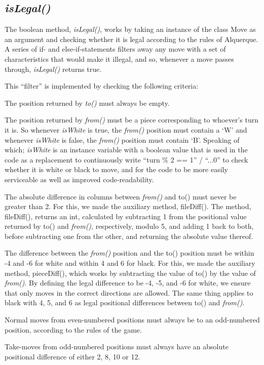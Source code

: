 \documentclass[12pt, a4paper]{article}
\begin{document}
\subsection{\emph{isLegal()}}
The boolean method, \emph{isLegal()}, works by taking an instance of the class Move as an argument and checking whether it is legal according to the rules of Alquerque. A series of if- and else-if-statements filters away any move with a set of characteristics that would make it illegal, and so, whenever a move passes through, \emph{isLegal()} returns true. \par 
This “filter” is implemented by checking the following criteria: \par
The position returned by \emph{to()} must always be empty. \par 
The position returned by \emph{from()} must be a piece corresponding to whoever's turn it is. So whenever \emph{isWhite} is true, the \emph{from()} position must contain a ‘W’ and whenever \emph{isWhite} is false, the \emph{from()} position must contain ‘B’. Speaking of which; \emph{isWhite} is an instance variable with a boolean value that is used in the code as a replacement to continuously write “turn \% 2 == 1” / “...0”  to check whether it is white or black to move, and for the code to be more easily serviceable as well as improved code-readability. \par
The absolute difference in columns between \emph{from()} and to() must never be greater than 2. For this, we made the auxiliary method, fileDiff(). The method, fileDiff(), returns an int, calculated by subtracting 1 from the positional value returned by to() and \emph{from()}, respectively, modulo 5, and adding 1 back to both, before subtracting one from the other, and returning the absolute value thereof. \par 
The difference between the \emph{from()} position and the to() position must be within -4 and -6 for white and within 4 and 6 for black. For this, we made the auxiliary method, pieceDiff(), which works by subtracting the value of to() by the value of \emph{from()}. By defining the legal difference to be -4, -5, and -6 for white, we ensure that only moves in the correct directions are allowed. The same thing applies to black with 4, 5, and 6 as legal positional differences between to() and \emph{from()}. \par
Normal moves from even-numbered positions must always be to an odd-numbered position, according to the rules of the game. \par
Take-moves from odd-numbered positions must always have an absolute positional difference of either 2, 8, 10 or 12. \par
\end{document}
